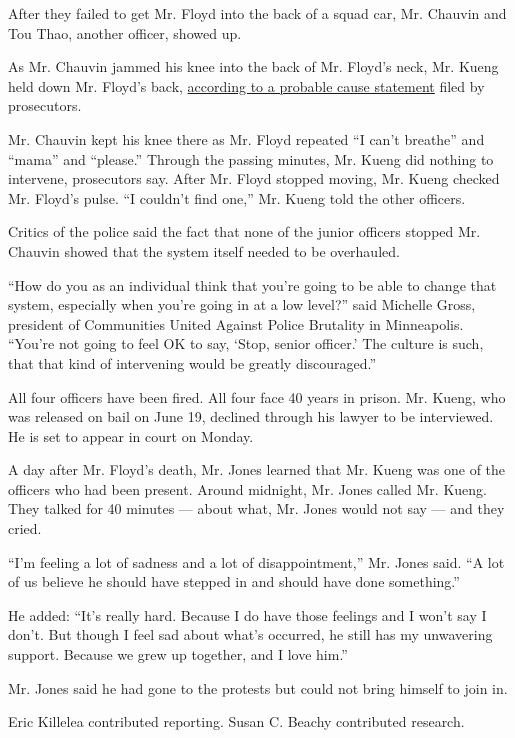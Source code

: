 After they failed to get Mr. Floyd into the back of a squad car, Mr.
Chauvin and Tou Thao, another officer, showed up.

As Mr. Chauvin jammed his knee into the back of Mr. Floyd's neck, Mr.
Kueng held down Mr. Floyd's back,
\href{https://www.ag.state.mn.us/Office/Communications/2020/docs/Complaint_kueng.pdf}{according
to a probable cause statement} filed by prosecutors.

Mr. Chauvin kept his knee there as Mr. Floyd repeated ``I can't
breathe'' and ``mama'' and ``please.'' Through the passing minutes, Mr.
Kueng did nothing to intervene, prosecutors say. After Mr. Floyd stopped
moving, Mr. Kueng checked Mr. Floyd's pulse. ``I couldn't find one,''
Mr. Kueng told the other officers.

Critics of the police said the fact that none of the junior officers
stopped Mr. Chauvin showed that the system itself needed to be
overhauled.

``How do you as an individual think that you're going to be able to
change that system, especially when you're going in at a low level?''
said Michelle Gross, president of Communities United Against Police
Brutality in Minneapolis. ``You're not going to feel OK to say, `Stop,
senior officer.' The culture is such, that that kind of intervening
would be greatly discouraged.''

All four officers have been fired. All four face 40 years in prison. Mr.
Kueng, who was released on bail on June 19, declined through his lawyer
to be interviewed. He is set to appear in court on Monday.

A day after Mr. Floyd's death, Mr. Jones learned that Mr. Kueng was one
of the officers who had been present. Around midnight, Mr. Jones called
Mr. Kueng. They talked for 40 minutes --- about what, Mr. Jones would
not say --- and they cried.

``I'm feeling a lot of sadness and a lot of disappointment,'' Mr. Jones
said. ``A lot of us believe he should have stepped in and should have
done something.''

He added: ``It's really hard. Because I do have those feelings and I
won't say I don't. But though I feel sad about what's occurred, he still
has my unwavering support. Because we grew up together, and I love
him.''

Mr. Jones said he had gone to the protests but could not bring himself
to join in.

Eric Killelea contributed reporting. Susan C. Beachy contributed
research.

